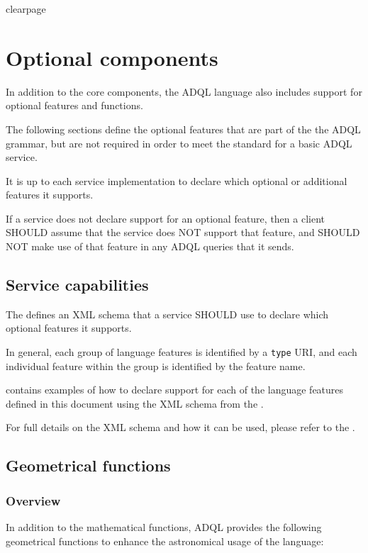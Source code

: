 \documentclass[11pt,a4paper]{ivoa}
\begin{document}
clearpage %
\section{Optional components}
\label{sec:optional}

In addition to the core components, the ADQL language also includes support
for optional features and functions.

The following sections define the optional features that are part of the
the ADQL grammar, but are not required in order to meet the standard for
a basic ADQL service.

It is up to each service implementation to declare which optional or
additional features it supports.

If a service does not declare support for an optional feature,
then a client SHOULD assume that the service does NOT support
that feature, and SHOULD NOT make use of that feature in any
ADQL queries that it sends.

\subsection{Service capabilities}
\label{sec:capabilities}

The \TAPRegSpec{} defines an XML schema that a service SHOULD
use to declare which optional features it supports.

In general, each group of language features is identified by a \verb:type:
URI, and each individual feature within the group is identified by the
feature name.

 contains examples of how to declare support
for each of the language features defined in this document using the
XML schema from the \TAPRegSpec{}.

For full details on the XML schema and how it can be used, please refer to
the \TAPRegSpec{}.

\subsection{Geometrical functions}
\label{sec:functions.geom}
\subsubsection{Overview}
\label{sec:functions.geom.overview}

In addition to the mathematical functions, ADQL provides the following geometrical
functions to enhance the astronomical usage of the language:
\end{document}
